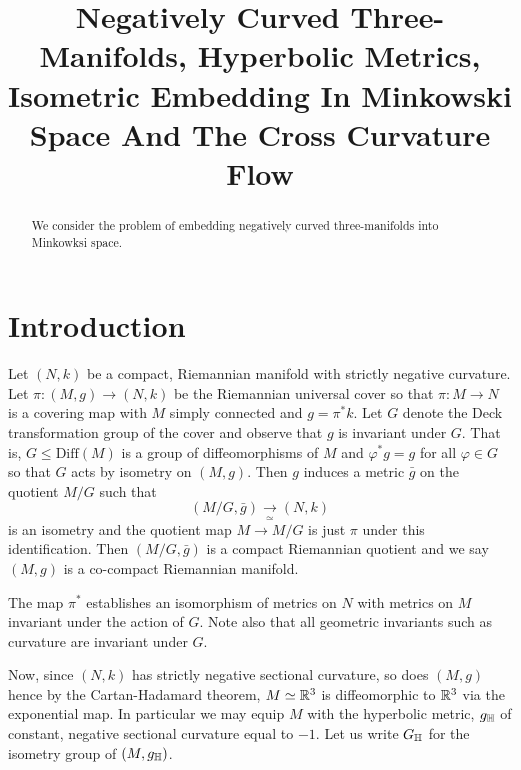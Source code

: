 \documentclass[a4paper, 12pt]{amsart}
\begin{document}
\title[Negatively Curved Three Manifolds]{Negatively Curved Three-Manifolds, Hyperbolic Metrics, Isometric Embedding In Minkowski Space And The Cross Curvature Flow}

\date{}

\dedicatory{}

\begin{abstract}
We consider the problem of embedding negatively curved three-manifolds into Minkowksi space.
\end{abstract}

\maketitle

\section{Introduction}
\label{sec:intro}

Let \((N, k)\) be a compact, Riemannian manifold with strictly negative curvature. Let \(\pi\colon (M, g) \to (N, k)\) be the Riemannian universal cover so that \(\pi : M \to N\) is a covering map with \(M\) simply connected and \(g = \pi^{\ast} k\). Let \(G\) denote the Deck transformation group of the cover and observe that \(g\) is invariant under \(G\). That is, \(G \leq \text{Diff}(M)\) is a group of diffeomorphisms of \(M\) and \(\varphi^{\ast} g = g\) for all \(\varphi \in G\) so that \(G\) acts by isometry on \((M, g)\). Then \(g\) induces a metric \(\bar{g}\) on the quotient \(M/G\) such that
\[
(M/G, \bar{g}) \underset{\simeq}{\to} (N, k)
\]
is an isometry
and the quotient map \(M \to M/G\) is just \(\pi\) under this identification. Then \((M/G, \bar{g})\) is a compact Riemannian quotient and we say \((M, g)\) is a co-compact Riemannian manifold.

\begin{rem}
The map \(\pi^{\ast}\) establishes an isomorphism of metrics on \(N\) with metrics on \(M\) invariant under the action of \(G\). Note also that all geometric invariants such as curvature are invariant under \(G\).
\end{rem}

Now, since \((N, k)\) has strictly negative sectional curvature, so does \((M, g)\) hence by the Cartan-Hadamard theorem, \(M \simeq \mathbb{R}^3\) is diffeomorphic to \(\mathbb{R}^3\) via the exponential map. In particular we may equip \(M\) with the hyperbolic metric, \(g_{\mathbb{H}}\) of constant, negative sectional curvature equal to \(-1\). Let us write \(G_{\mathbb{H}}\) for the isometry group of \((M, g_{\mathbb{H}})\).
\end{document}
